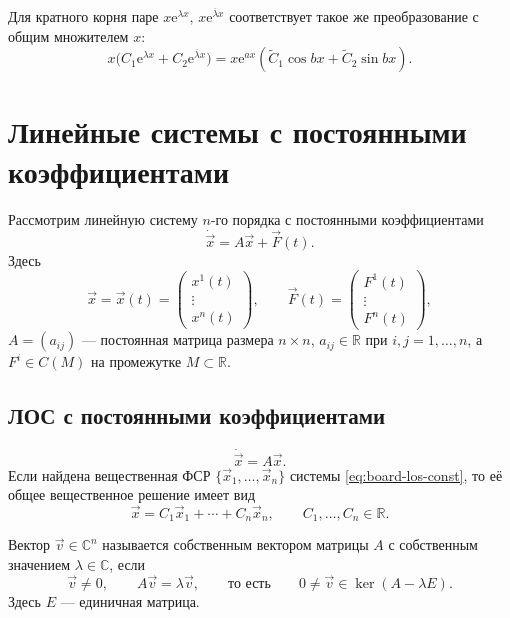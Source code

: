 \documentclass[12pt,a4paper]{article}
\numberwithin{equation}{section}
\newcommand{\R}{\mathbb{R}}
\newcommand{\vect}[1]{\vec{#1}}
\newcommand{\e}{\mathrm{e}}
\begin{document}
Для кратного корня паре \(x\e^{\lambda x},\,x\e^{\overline\lambda x}\)
соответствует такое же преобразование с общим множителем \(x\):
\[
 x\bigl(C_1\e^{\lambda x}+C_2\e^{\overline\lambda x}\bigr)
 =x\e^{ax}(\widetilde C_1\cos bx+\widetilde C_2\sin bx).
\]

\section[Линейные системы с постоянными коэффициентами]{Линейные системы с постоянными коэффициентами}
\label{sec:los-constant-full}

Рассмотрим линейную систему $n$-го порядка с постоянными коэффициентами
\begin{equation}
 \dot{\vect{x}}=A\vect{x}+\vect{F}(t).
 \label{eq:board-lns-const}
\end{equation}
Здесь
\[
 \vect{x}=\vect{x}(t)=\begin{pmatrix}x^1(t)\\ \vdots\\ x^n(t)\end{pmatrix},
 \qquad
 \vect{F}(t)=\begin{pmatrix}F^1(t)\\ \vdots\\ F^n(t)\end{pmatrix},
\]
$A=(a_{ij})$ --- постоянная матрица размера $n\times n$,
$a_{ij}\in\R$ при $i,j=1,\ldots,n$,
а $F^i\in C(M)$ на промежутке $M\subset\R$.

\subsection{ЛОС с постоянными коэффициентами}

\begin{equation}
 \dot{\vect{x}}=A\vect{x}.
 \label{eq:board-los-const}
\end{equation}
Если найдена вещественная ФСР $\{\vect{x}_1,\ldots,\vect{x}_n\}$
системы \eqref{eq:board-los-const}, то её общее вещественное решение имеет вид
\[
 \vect{x}=C_1\vect{x}_1+\cdots+C_n\vect{x}_n,\qquad
 C_1,\ldots,C_n\in\R.
\]

\begin{definitionHSE}
Вектор $\vect v\in\mathbb C^n$ называется собственным вектором матрицы $A$
с собственным значением $\lambda\in\mathbb C$, если
\[
 \vect v\ne0,\qquad A\vect v=\lambda\vect v,
 \qquad\text{то есть}\qquad
 0\ne\vect v\in\ker(A-\lambda E).
\]
Здесь $E$ --- единичная матрица.
\end{definitionHSE}
\end{document}
